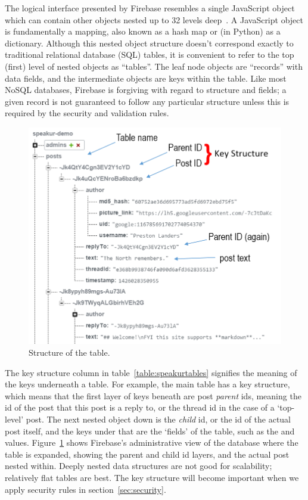 The logical interface presented by Firebase resembles a single JavaScript object which can contain other objects nested up to 32 levels deep~\cite{firebasecontributors2015}.
A JavaScript object is fundamentally a  mapping, also known as a hash map or (in Python) as a dictionary.
Although this nested object structure doesn't correspond exactly to traditional relational database (SQL) tables, 
it is convenient to refer to the top (first) level of nested objects as ``tables''.
The leaf node objects are ``records'' with data fields, and the intermediate objects are keys within the table.
Like most NoSQL databases, Firebase is forgiving with regard to structure and fields; 
a given record is not guaranteed to follow any particular structure unless this is required by the security and validation rules.

\begin{figure}[htb]
\centering
\includegraphics[width=\textwidth]{images/firebase_admin_posts_b.png}
\caption{Structure of the  table.}
\label{f:firebase_admin_posts}
\end{figure}

The key structure column in table~\ref{table:speakurtables} signifies the meaning of the keys underneath a table. 
For example, the main  table has a  key structure, 
which means that the first layer of keys beneath  are post \textit{parent} ids, 
meaning the id of the post that this post is a reply to, 
or the thread id in the case of a `top-level' post.
The next nested object down is the \textit{child} id, 
or the id of the actual post itself, 
and the keys under that are the `fields' of the table, 
such as the  and  values.
Figure~\ref{f:firebase_admin_posts} shows Firebase's administrative view of the database where the  table is expanded, 
showing the parent and child id layers, 
and the actual post nested within.
Deeply nested data structures are not good for scalability; 
relatively flat tables are best.
The key structure will become important when we apply security rules in section~\ref{sec:security}.

